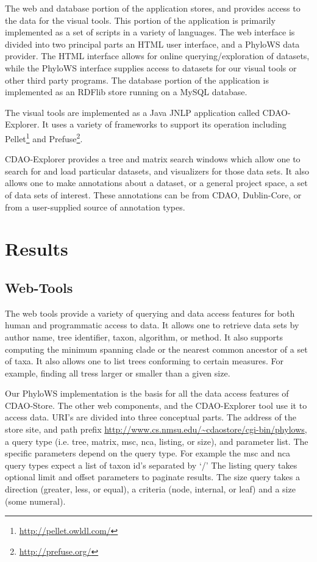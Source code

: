 \documentclass[10pt]{bmc_article}
\newenvironment{bmcformat}{\begin{raggedright}\baselineskip20pt\sloppy\setboolean{publ}{false}}{\end{raggedright}\baselineskip20pt\sloppy}
\begin{document}
\begin{bmcformat}
The web and database portion of the application stores, and provides access to the data for the visual tools. This
portion of the application is primarily implemented as a set of scripts in a variety of languages. The web interface
is divided into two principal parts an HTML user interface, and a PhyloWS data provider. The HTML interface allows 
for online querying/exploration of datasets, while the PhyloWS interface supplies access to datasets for our visual
tools or other third party programs. The database portion of the application is implemented as an RDFlib store running
on a MySQL database. 

The visual tools are implemented as a Java JNLP application called CDAO-Explorer. It uses a variety of frameworks
to support its operation including Pellet\footnote{\url{http://pellet.owldl.com/}} and
  Prefuse\footnote{\url{http://prefuse.org/}}. 

CDAO-Explorer provides a tree and matrix search windows which allow one to search for and load particular datasets,
and visualizers for those data sets. It also allows one to make annotations about a dataset, or a general project space,
a set of data sets of interest. These annotations can be from CDAO, Dublin-Core, or from a user-supplied source of
annotation types.



 
\section*{Results}
  \subsection*{Web-Tools}
  The web tools provide a variety of querying and data access features for both
human and programmatic access to data. It allows one to retrieve data sets by
author name, tree identifier, taxon, algorithm, or method. It also supports
computing the minimum spanning clade or the nearest common ancestor of a set of
taxa. It also allows one to  list trees conforming to certain measures. For
example, finding all tress larger or smaller than a given size. 

   Our PhyloWS implementation is the basis for all the data access features of
CDAO-Store. The other web components, and the CDAO-Explorer tool use it to
access data. URI's are divided into three conceptual parts. The address of the
store site, and path prefix
\url{http://www.cs.nmsu.edu/~cdaostore/cgi-bin/phylows}, a query type (i.e.
tree, matrix, msc, nca, listing, or size), and parameter list. The specific
parameters depend on the query type. For example the msc and nca query types
expect a list of taxon id's separated by `/' The listing query takes optional
limit and offset parameters to paginate results. The size query takes a
direction (greater, less, or equal),  a criteria (node, internal, or leaf) and
a size (some numeral).


\end{bmcformat}
\end{document}
